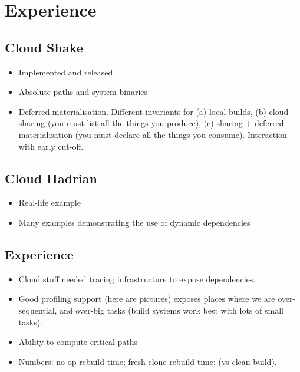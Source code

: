 \section{Experience}\label{sec-experience}


\subsection{Cloud Shake}\label{sec-cloud-shake}

\begin{itemize}
\item Implemented and released
\item Absolute paths and system binaries
\item Deferred materialisation. Different invariants for (a) local builds, (b) cloud sharing (you must list all the things you produce), (c) sharing + deferred materialisation (you must declare all the things you consume). Interaction with early cut-off.
\end{itemize}

\subsection{Cloud Hadrian}

\begin{itemize}
\item  Real-life example
\item Many examples demonstrating the use of dynamic dependencies
\end{itemize}

\subsection{Experience}

\begin{itemize}
\item  Cloud stuff needed tracing infrastructure to expose dependencies.
\item  Good profiling support (here are pictures) exposes places where we are over-sequential, and over-big tasks (build systems work best with lots of small tasks).
\item Ability to compute critical paths
\item Numbers: no-op rebuild time; fresh clone rebuild time; (vs clean build).
\end{itemize}
